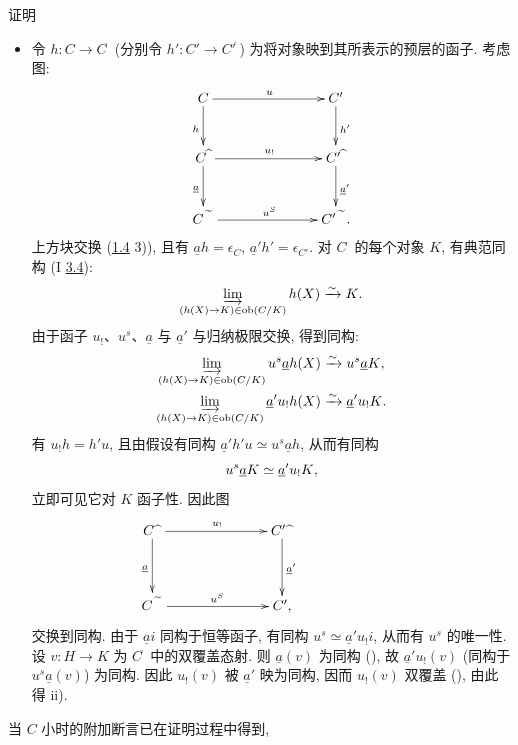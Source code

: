 \begin{enonce*}[remark]{证明}
\begin{itemize}
\item[iv) $\Rightarrow$ ii):] 令 $h:C\rightarrow C^{\widehat{\phantom{,}}}$
(分别令 $h':C'\rightarrow {C'}^{\widehat{\phantom{,}}}$)
为将对象映到其所表示的预层的函子. 考虑图:
\[
\xymatrix@C=2.5cm@R=1cm{
C \ar[r]^{u}\ar[d]_{h}             &   C' \ar[d]^{h'}\\
C{\widehat{\phantom{i}}} \ar[d]_{\underline{a}} \ar[r]^{u_!}&
C'{\widehat{\phantom{i}}} \ar[d]^{\underline{a}'}\\
C{\widetilde{\phantom{A}}} \ar[r]^{u^{S}}&
C'{\widetilde{\phantom{A}}}. }
\]
上\pageoriginale{}方块交换 (\hyperref[III.rem1.4]{1.4} 3)),
且有 $\underline{a}h=\epsilon_C$, $\underline{a}'h'=\epsilon_{C'}$.
对 $C^{\widehat{\phantom{,}}}$ 的每个对象 $K$, 有典范同构
(I \hyperref[I.prop3.4]{3.4}):
$$
\varinjlim_{(h(X)\rightarrow K)\in \operatorname{ob} (C/K)} h(X)\xrightarrow{\sim}
K{}.
$$
由于函子 $u_{!}$、$u^s$、$\underline{a}$ 与 $\underline{a}'$ 与归纳极限交换,
得到同构:
\begin{gather*}
\varinjlim_{(h(X)\rightarrow K)\in \operatorname{ob} (C/K)}
u^s\underline{a}h(X)\xrightarrow{\sim} u^s \underline{a}K{},\\
\varinjlim_{(h(X)\rightarrow K)\in \operatorname{ob} (C/K)}
\underline{a}'u_{!}h(X)\xrightarrow{\sim} \underline{a}'u_{!}K{}.
\end{gather*}
有 $u_{!}h=h'u$, 且由假设有同构
$\underline{a}'h'u\simeq u^s \underline{a}h$, 从而有同构
$$
u^s\underline{a}K\simeq \underline{a}'u_{!}K{},
$$
立即可见它对 $K$ 函子性. 因此图
\[
\xymatrix@C=2.5cm@R=1.35cm{
C\widehat{\phantom{a}} \ar[r]^{u_!} \ar[d]_{\underline{a}}&  C'\widehat{\phantom{a}}\ar[d]^{\underline{a}'}\\
C \widetilde{\phantom{A}} \ar[r]^{u^{S}}&  C',& }
\]
交换到同构. 由于 $\underline{a}i$ 同构于恒等函子,
有同构 $u^s\simeq \underline{a}'u_{!}i$, 从而有 $u^s$ 的唯一性.
设 $v:H\rightarrow K$ 为 $C^{\widehat{\phantom{,}}}$ 中的双覆盖态射.
则 $\underline{a}(v)$ 为同构 (),
故 $\underline{a}'u_{!}(v)$ (同构于 $u^s\underline{a}(v)$) 为同构.
因此 $u_{!}(v)$ 被 $\underline{a}'$ 映为同构, 因而 $u_{!}(v)$ 双覆盖
(), 由此得 ii).
\end{itemize}
\end{enonce*}

当 $C$ 小时的附加\pageoriginale{}断言已在证明过程中得到, \cqfd

\setcounter{subsection}{2} \setcounter{subsubsection}{0}



